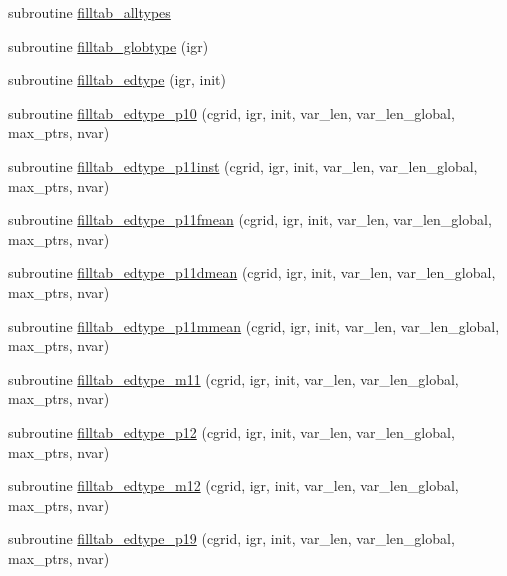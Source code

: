 \begin{DoxyCompactItemize}
\item 
subroutine \hyperlink{namespaceed__state__vars_afdc01451213108f52d4c3ac14a804f74}{filltab\+\_\+alltypes}
\item 
subroutine \hyperlink{namespaceed__state__vars_ac479c3704655d44e4b6b87b703c488a1}{filltab\+\_\+globtype} (igr)
\item 
subroutine \hyperlink{namespaceed__state__vars_a31b9d7889efe4b92ff8dc064eb655d4e}{filltab\+\_\+edtype} (igr, init)
\item 
subroutine \hyperlink{namespaceed__state__vars_abb260c56b27f849e311a4ff12439a2d6}{filltab\+\_\+edtype\+\_\+p10} (cgrid, igr, init, var\+\_\+len, var\+\_\+len\+\_\+global, max\+\_\+ptrs, nvar)
\item 
subroutine \hyperlink{namespaceed__state__vars_a256581db31438ac1eab6658d8eed7e6d}{filltab\+\_\+edtype\+\_\+p11inst} (cgrid, igr, init, var\+\_\+len, var\+\_\+len\+\_\+global, max\+\_\+ptrs, nvar)
\item 
subroutine \hyperlink{namespaceed__state__vars_a6d7159b5099487f658877739e29f3f40}{filltab\+\_\+edtype\+\_\+p11fmean} (cgrid, igr, init, var\+\_\+len, var\+\_\+len\+\_\+global, max\+\_\+ptrs, nvar)
\item 
subroutine \hyperlink{namespaceed__state__vars_a7ed69aec83eaa248927d38ddd7a67daa}{filltab\+\_\+edtype\+\_\+p11dmean} (cgrid, igr, init, var\+\_\+len, var\+\_\+len\+\_\+global, max\+\_\+ptrs, nvar)
\item 
subroutine \hyperlink{namespaceed__state__vars_a714397c35a6eb326065670c98745d2ee}{filltab\+\_\+edtype\+\_\+p11mmean} (cgrid, igr, init, var\+\_\+len, var\+\_\+len\+\_\+global, max\+\_\+ptrs, nvar)
\item 
subroutine \hyperlink{namespaceed__state__vars_ab9eaf06f12f8739d511341e99dad51eb}{filltab\+\_\+edtype\+\_\+m11} (cgrid, igr, init, var\+\_\+len, var\+\_\+len\+\_\+global, max\+\_\+ptrs, nvar)
\item 
subroutine \hyperlink{namespaceed__state__vars_a78f2d3db9b379cbde2178f6366ebdd06}{filltab\+\_\+edtype\+\_\+p12} (cgrid, igr, init, var\+\_\+len, var\+\_\+len\+\_\+global, max\+\_\+ptrs, nvar)
\item 
subroutine \hyperlink{namespaceed__state__vars_a4834dc1fa685230019880cc6c9cf4ed0}{filltab\+\_\+edtype\+\_\+m12} (cgrid, igr, init, var\+\_\+len, var\+\_\+len\+\_\+global, max\+\_\+ptrs, nvar)
\item 
subroutine \hyperlink{namespaceed__state__vars_a6265fcb655ce420fb53d9d9a70a676c7}{filltab\+\_\+edtype\+\_\+p19} (cgrid, igr, init, var\+\_\+len, var\+\_\+len\+\_\+global, max\+\_\+ptrs, nvar)

\end{DoxyCompactItemize}

